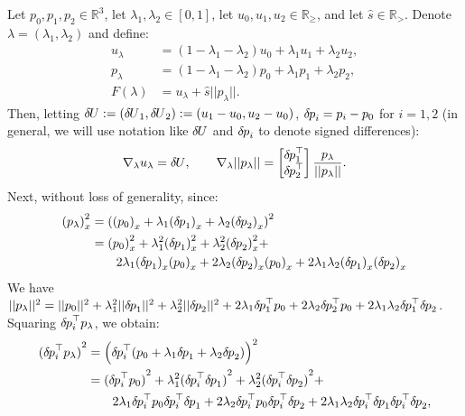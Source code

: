 \documentclass{article}
\begin{document}
Let $p_0, p_1, p_2 \in \mathbb{R}^3$, let
$\lambda_1, \lambda_2 \in [0, 1]$, let
$u_0, u_1, u_2 \in \mathbb{R}_{\geq}$, and let
$\hat{s} \in \mathbb{R}_{>}$. Denote
$\lambda = (\lambda_1, \lambda_2)$ and define:
\begin{align*}
  u_\lambda &= (1 - \lambda_1 - \lambda_2) u_0 + \lambda_1 u_1 + \lambda_2 u_2, \\
  p_\lambda &= (1 - \lambda_1 - \lambda_2) p_0 + \lambda_1 p_1 + \lambda_2 p_2, \\
  F(\lambda) &= u_\lambda + \hat{s} ||p_\lambda||.
\end{align*}
Then, letting
${\delta \hspace{-0.09em} U} := ({\delta \hspace{-0.09em} U}_1, {\delta \hspace{-0.09em} U}_2) := (u_1 - u_0, u_2 - u_0)$,
${\delta \hspace{-0.08em} p}_i = p_i - p_0$ for $i = 1, 2$ (in general, we will use
notation like ${\delta \hspace{-0.09em} U}$ and ${\delta \hspace{-0.08em} p}_i$ to denote signed
differences):
\begin{align*}
  \nabla_\lambda u_\lambda = {\delta \hspace{-0.09em} U}, \qquad \nabla_\lambda ||p_\lambda|| = \begin{bmatrix} {\delta \hspace{-0.08em} p}_1^\top \\ {\delta \hspace{-0.08em} p}_2^\top \end{bmatrix} \frac{p_\lambda}{||p_\lambda||}.
\end{align*}
Next, without loss of generality, since:
\begin{align*}
  {(p_\lambda)}_x^2
  &= \left({(p_0)}_x + \lambda_1 {({\delta \hspace{-0.08em} p}_1)}_x + \lambda_2 {({\delta \hspace{-0.08em} p}_2)}_x\right)^2 \\
  &= {(p_0)}_x^2 + \lambda_1^2 {({\delta \hspace{-0.08em} p}_1)}_x^2 + \lambda_2^2 {({\delta \hspace{-0.08em} p}_2)}_x^2 + \\
  &\qquad 2 \lambda_1 {({\delta \hspace{-0.08em} p}_1)}_x {(p_0)}_x + 2 \lambda_2 {({\delta \hspace{-0.08em} p}_2)}_x {(p_0)}_x + 2 \lambda_1 \lambda_2 {({\delta \hspace{-0.08em} p}_1)}_x {({\delta \hspace{-0.08em} p}_2)}_x
\end{align*}
We have
$||p_\lambda||^2 = ||p_0||^2 + \lambda_1^2 ||{\delta \hspace{-0.08em} p}_1||^2 +
\lambda_2^2 ||{\delta \hspace{-0.08em} p}_2||^2 + 2 \lambda_1 {\delta \hspace{-0.08em} p}_1^\top p_0 + 2
\lambda_2 {\delta \hspace{-0.08em} p}_2^\top p_0 + 2 \lambda_1 \lambda_2 {\delta \hspace{-0.08em} p}_1^\top
{\delta \hspace{-0.08em} p}_2$. Squaring ${\delta \hspace{-0.08em} p}_i^\top p_\lambda$, we obtain:
\begin{align*}
  {({\delta \hspace{-0.08em} p}_i^\top p_\lambda)}^2
  &= \left({\delta \hspace{-0.08em} p}_i^\top (p_0 + \lambda_1 {\delta \hspace{-0.08em} p}_1 + \lambda_2 {\delta \hspace{-0.08em} p}_2)\right)^2 \\
  &= {({\delta \hspace{-0.08em} p}_i^\top p_0)}^2 + \lambda_1^2 {({\delta \hspace{-0.08em} p}_i^\top {\delta \hspace{-0.08em} p}_1)}^2 + \lambda_2^2 {({\delta \hspace{-0.08em} p}_i^\top {\delta \hspace{-0.08em} p}_2)}^2 + \\
  &\qquad 2 \lambda_1 {\delta \hspace{-0.08em} p}_i^\top p_0 {\delta \hspace{-0.08em} p}_i^\top {\delta \hspace{-0.08em} p}_1 + 2 \lambda_2 {\delta \hspace{-0.08em} p}_i^\top p_0 {\delta \hspace{-0.08em} p}_i^\top {\delta \hspace{-0.08em} p}_2  + 2 \lambda_1 \lambda_2 {\delta \hspace{-0.08em} p}_i^\top {\delta \hspace{-0.08em} p}_1 {\delta \hspace{-0.08em} p}_i^\top {\delta \hspace{-0.08em} p}_2,
\end{align*}
\end{document}
